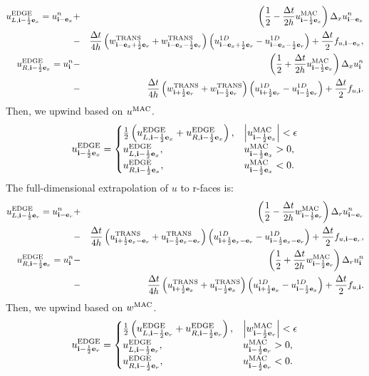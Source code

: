 \begin{eqnarray}
u_{L,{\bf i}-\frac{1}{2}{\bf e}_x}^{\rm EDGE} = u_{{\bf i}-{\bf e}_x}^n &+& \left(\frac{1}{2} -
\frac{\Delta t}{2h}u_{{\bf i}-\frac{1}{2}{\bf e}_x}^{\rm MAC}\right)\Delta_x u_{{\bf i}-{\bf e}_x}^n
\nonumber \\ &-&
\frac{\Delta t}{4h}\left(w_{{\bf i}-{\bf e}_x+\frac{1}{2}{\bf e}_r}^{\rm TRANS}+w_{{\bf i}-{\bf e}_x-\frac{1}{2}{\bf e}_r}^{\rm TRANS}\right)\left(u_{{\bf i}-{\bf e}_x+\frac{1}{2}{\bf e}_r}^{1D}
- u_{{\bf i}-{\bf e}_x-\frac{1}{2}{\bf e}_r}^{1D}\right) + \frac{\Delta t}{2}f_{u,{\bf i}-{\bf e}_x},
\\ u_{R,{\bf i}-\frac{1}{2}{\bf e}_x}^{\rm EDGE} = u_{{\bf i}}^n &-& \left(\frac{1}{2} +
\frac{\Delta t}{2h}u_{{\bf i}-\frac{1}{2}{\bf e}_x}^{\rm MAC}\right)\Delta_x u_{{\bf i}}^n
\nonumber \\ &-&
\frac{\Delta t}{4h}\left(w_{{\bf i}+\frac{1}{2}{\bf e}_r}^{\rm TRANS}+w_{{\bf i}-\frac{1}{2}{\bf e}_r}^{\rm TRANS}\right)\left(u_{{\bf i}+\frac{1}{2}{\bf e}_r}^{1D}
- u_{{\bf i}-\frac{1}{2}{\bf e}_r}^{1D}\right) + \frac{\Delta t}{2}f_{u,{\bf i}}.
\end{eqnarray}
Then, we upwind based on $u^{\rm MAC}$.
\begin{equation}
u_{{\bf i}-\frac{1}{2}{\bf e}_x}^{\rm EDGE} =
\begin{cases}
\frac{1}{2}\left(u_{L,{\bf i}-\frac{1}{2}{\bf e}_x}^{\rm EDGE} + u_{R,{\bf i}-\frac{1}{2}{\bf e}_x}^{\rm EDGE}\right), & \left|u^{\rm MAC}_{{\bf i}-\frac{1}{2}{\bf e}_x}\right| < \epsilon \\
u_{L,{\bf i}-\frac{1}{2}{\bf e}_x}^{\rm EDGE}, & u^{\rm MAC}_{{\bf i}-\frac{1}{2}{\bf e}_x} > 0, \\
u_{R,{\bf i}-\frac{1}{2}{\bf e}_x}^{\rm EDGE}, & u^{\rm MAC}_{{\bf i}-\frac{1}{2}{\bf e}_x} < 0.
\end{cases}
\end{equation}
The full-dimensional extrapolation of $u$ to r-faces is:
\begin{eqnarray}
u_{L,{\bf i}-\frac{1}{2}{\bf e}_r}^{\rm EDGE} = u_{{\bf i}-{\bf e}_r}^n &+& \left(\frac{1}{2} - \frac{\Delta t}{2h}w_{{\bf i}-\frac{1}{2}{\bf e}_r}^{\rm MAC}\right)\Delta_r u_{{\bf i}-{\bf e}_r}^n \nonumber \\
&-& \frac{\Delta t}{4h}\left(u_{{\bf i}+\frac{1}{2}{\bf e}_x-{\bf e}_r}^{\rm TRANS}+u_{{\bf i}-\frac{1}{2}{\bf e}_x-{\bf e}_r}^{\rm TRANS}\right)\left(u_{{\bf i}+\frac{1}{2}{\bf e}_x-{\bf e}_r}^{1D} - u_{{\bf i}-\frac{1}{2}{\bf e}_x-{\bf e}_r}^{1D}\right) + \frac{\Delta t}{2}f_{u,{\bf i}-{\bf e}_r},  \\
u_{R,{\bf i}-\frac{1}{2}{\bf e}_r}^{\rm EDGE} = u_{{\bf i}}^n &-& \left(\frac{1}{2} + \frac{\Delta t}{2h}w_{{\bf i}-\frac{1}{2}{\bf e}_r}^{\rm MAC}\right)\Delta_r u_{{\bf i}}^n \nonumber \\
&-& \frac{\Delta t}{4h}\left(u_{{\bf i}+\frac{1}{2}{\bf e}_x}^{\rm TRANS}+u_{{\bf i}-\frac{1}{2}{\bf e}_x}^{\rm TRANS}\right)\left(u_{{\bf i}+\frac{1}{2}{\bf e}_x}^{1D} - u_{{\bf i}-\frac{1}{2}{\bf e}_x}^{1D}\right) + \frac{\Delta t}{2}f_{u,{\bf i}}. 
\end{eqnarray}
Then, we upwind based on $w^{\rm MAC}$.
\begin{equation}
u_{{\bf i}-\frac{1}{2}{\bf e}_r}^{\rm EDGE} =
\begin{cases}
\frac{1}{2}\left(u_{L,{\bf i}-\frac{1}{2}{\bf e}_r}^{\rm EDGE} + u_{R,{\bf i}-\frac{1}{2}{\bf e}_r}^{\rm EDGE}\right), & \left|w^{\rm MAC}_{{\bf i}-\frac{1}{2}{\bf e}_r}\right| < \epsilon \\
u_{L,{\bf i}-\frac{1}{2}{\bf e}_r}^{\rm EDGE}, & u^{\rm MAC}_{{\bf i}-\frac{1}{2}{\bf e}_r} > 0, \\
u_{R,{\bf i}-\frac{1}{2}{\bf e}_r}^{\rm EDGE}, & u^{\rm MAC}_{{\bf i}-\frac{1}{2}{\bf e}_r} < 0.
\end{cases}
\end{equation}
